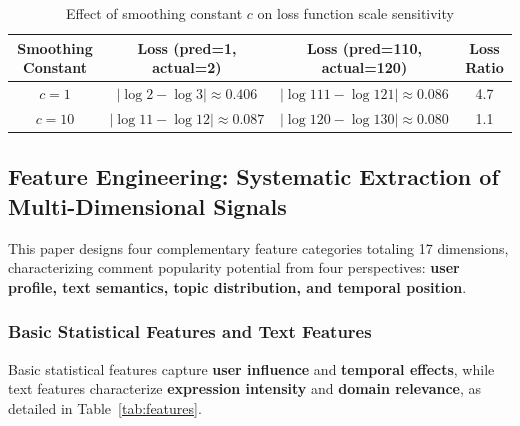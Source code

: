 \documentclass[10pt]{article}
\begin{document}
\begin{table}[H]
\centering
\caption{Effect of smoothing constant $c$ on loss function scale sensitivity}
\label{tab:smoothing_constant}
\begin{tabular}{cccc}
\toprule
\textbf{Smoothing Constant} & \textbf{Loss (pred=1, actual=2)} & \textbf{Loss (pred=110, actual=120)} & \textbf{Loss Ratio} \\
\midrule
$c=1$ & $|\log 2 - \log 3| \approx 0.406$ & $|\log 111 - \log 121| \approx 0.086$ & 4.7 \\
$c=10$ & $|\log 11 - \log 12| \approx 0.087$ & $|\log 120 - \log 130| \approx 0.080$ & 1.1 \\
\bottomrule
\end{tabular}
\end{table}

\subsection{Feature Engineering: Systematic Extraction of Multi-Dimensional Signals}

This paper designs four complementary feature categories totaling 17 dimensions, characterizing comment popularity potential from four perspectives: \textbf{user profile, text semantics, topic distribution, and temporal position}.

\subsubsection{Basic Statistical Features and Text Features}

Basic statistical features capture \textbf{user influence} and \textbf{temporal effects}, while text features characterize \textbf{expression intensity} and \textbf{domain relevance}, as detailed in Table~\ref{tab:features}.
\end{document}
